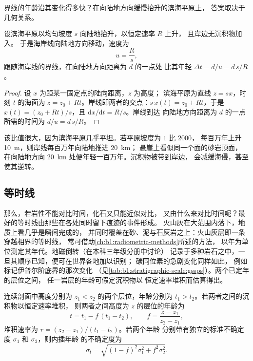 界线的年龄沿其变化得多快？在向陆地方向缓慢抬升的滨海平原上，
答案取决于几何关系。

\begin{proposition}[海侵的速度]\label{prop:b1:stratigraphic-scale:transgression}
设滨海平原以均匀坡度 $s$ 向陆地抬升，以恒定速率 $R$ 上升，
且岸边无沉积物加入。
于是海岸线向陆地方向移动，速度为
\[
  u = \frac{R}{s},
\]
跟随海岸线的界线，在向陆地方向距离为 $d$ 的一点处
比其年轻 $\Delta t = d/u = d\,s/R$。
\end{proposition}

\begin{proof}
设 $x$ 为距某一固定点的陆向距离，$z$ 为高度；
滨海平原为直线 $z = s x$，时刻 $t$ 的海面为
$z = z_0 + R t$。岸线即两者的交点：$s\,x(t) = z_0 + R t$，于是
$x(t) = (z_0 + R t)/s$，且 $\mathrm dx/\mathrm dt = R/s$。岸线到达
向陆地方向距离为 $d$ 的一点所需的时间为 $d/u = d\,s/R$。
\end{proof}

该比值很大，因为滨海平原几乎平坦。若平原坡度为 $1$ 比 $2000$，
每百万年上升 \qty{10}{m}，则岸线每百万年向陆地推进 \qty{20}{km}；
悬崖上看似同一个面的砂岩顶面，
在向陆地方向 \qty{20}{km} 处便年轻一百万年。沉积物被带到岸边，
会减缓海侵，甚至使其逆转。

\subsection*{等时线}

那么，若岩性不能对比时间，化石又只能近似对比，
又由什么来对比时间呢？最好的等时线由那些在各处同时留下痕迹的事件形成。
火山灰在大范围内落下，地质上看几乎是瞬间完成的，
并同时覆盖在砂、泥与石灰岩之上：火山灰层即一条穿越相界的等时线，
常可借助\cref{ch:b1:radiometric-methods}所述的方法，
以年为单位测定其年代。地磁倒转（在本科三年级分册中讨论）
记录于多种岩石之中，一旦其顺序已知，便可在世界各地加以识别；
碳同位素的急剧变化同样如此，
例如标记伊普尔阶底界的那次变化
（见\cref{tab:b1:stratigraphic-scale:gssps}）。两个已定年的层位之间，
任一岩层的年龄可假定沉积物以
恒定速率堆积而估算得出。

\begin{proposition}[两个已定年层位之间的年龄]\label{prop:b1:stratigraphic-scale:interpolation}
连续剖面中高度分别为 $z_1 < z_2$ 的两个层位，年龄分别为
$t_1 > t_2$。若两者之间的沉积物以恒定速率堆积，
则两者之间高度为 $z$ 的层位的年龄为
\[
  t = t_1 - f\,(t_1 - t_2), \qquad f = \frac{z - z_1}{z_2 - z_1},
\]
堆积速率为 $r = (z_2 - z_1)/(t_1 - t_2)$。若两个年龄
分别带有独立的标准不确定度 $\sigma_1$ 和 $\sigma_2$，则内插年龄
的不确定度为
\[
  \sigma_t = \sqrt{(1 - f)^2 \sigma_1^2 + f^2 \sigma_2^2}.
\]
\end{proposition}

